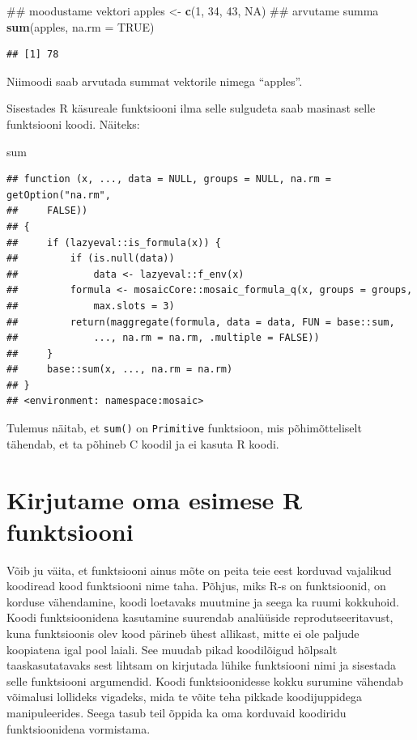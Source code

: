 \documentclass[]{book}
\newenvironment{Shaded}{\begin{snugshade}}{\end{snugshade}}
\newcommand{\KeywordTok}[1]{\textcolor[rgb]{0.13,0.29,0.53}{\textbf{#1}}}
\newcommand{\DataTypeTok}[1]{\textcolor[rgb]{0.13,0.29,0.53}{#1}}
\newcommand{\DecValTok}[1]{\textcolor[rgb]{0.00,0.00,0.81}{#1}}
\newcommand{\StringTok}[1]{\textcolor[rgb]{0.31,0.60,0.02}{#1}}
\newcommand{\OtherTok}[1]{\textcolor[rgb]{0.56,0.35,0.01}{#1}}
\newcommand{\NormalTok}[1]{#1}
\begin{document}
\begin{Shaded}
\begin{Highlighting}[]
\NormalTok{## moodustame vektori}
\NormalTok{apples <-}\StringTok{ }\KeywordTok{c}\NormalTok{(}\DecValTok{1}\NormalTok{, }\DecValTok{34}\NormalTok{, }\DecValTok{43}\NormalTok{, }\OtherTok{NA}\NormalTok{)}
\NormalTok{## arvutame summa}
\KeywordTok{sum}\NormalTok{(apples, }\DataTypeTok{na.rm =} \OtherTok{TRUE}\NormalTok{)}
\end{Highlighting}
\end{Shaded}

\begin{verbatim}
## [1] 78
\end{verbatim}

Niimoodi saab arvutada summat vektorile nimega ``apples''.

Sisestades R käsureale funktsiooni ilma selle sulgudeta saab masinast
selle funktsiooni koodi. Näiteks:

\begin{Shaded}
\begin{Highlighting}[]
\NormalTok{sum}
\end{Highlighting}
\end{Shaded}

\begin{verbatim}
## function (x, ..., data = NULL, groups = NULL, na.rm = getOption("na.rm", 
##     FALSE)) 
## {
##     if (lazyeval::is_formula(x)) {
##         if (is.null(data)) 
##             data <- lazyeval::f_env(x)
##         formula <- mosaicCore::mosaic_formula_q(x, groups = groups, 
##             max.slots = 3)
##         return(maggregate(formula, data = data, FUN = base::sum, 
##             ..., na.rm = na.rm, .multiple = FALSE))
##     }
##     base::sum(x, ..., na.rm = na.rm)
## }
## <environment: namespace:mosaic>
\end{verbatim}

Tulemus näitab, et \texttt{sum()} on \texttt{Primitive} funktsioon, mis
põhimõtteliselt tähendab, et ta põhineb C koodil ja ei kasuta R koodi.

\section{Kirjutame oma esimese R
funktsiooni}\label{kirjutame-oma-esimese-r-funktsiooni}

Võib ju väita, et funktsiooni ainus mõte on peita teie eest korduvad
vajalikud koodiread kood funktsiooni nime taha. Põhjus, miks R-s on
funktsioonid, on korduse vähendamine, koodi loetavaks muutmine ja seega
ka ruumi kokkuhoid. Koodi funktsioonidena kasutamine suurendab
analüüside reprodutseeritavust, kuna funktsioonis olev kood pärineb
ühest allikast, mitte ei ole paljude koopiatena igal pool laiali. See
muudab pikad koodilõigud hõlpsalt taaskasutatavaks sest lihtsam on
kirjutada lühike funktsiooni nimi ja sisestada selle funktsiooni
argumendid. Koodi funktsioonidesse kokku surumine vähendab võimalusi
lollideks vigadeks, mida te võite teha pikkade koodijuppidega
manipuleerides. Seega tasub teil õppida ka oma korduvaid koodiridu
funktsioonidena vormistama.
\end{document}
